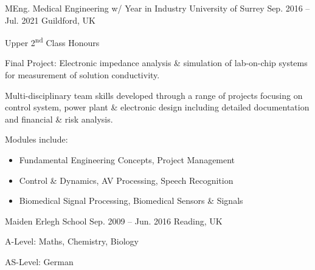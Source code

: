 

\begin{cventries}

  \cventry
    {MEng. Medical Engineering w/ Year in Industry}
    {University of Surrey}
    {Sep. 2016 -- Jul. 2021}
    {Guildford, UK}
    {
      \begin{cvitems}
        \item[] Upper 2\textsuperscript{nd} Class Honours\\
        \item Final Project: Electronic impedance analysis \& simulation of lab-on-chip systems for measurement of solution conductivity.
        \item Multi-disciplinary team skills developed through a range of projects focusing on control system, power plant \& electronic design including detailed documentation and financial \& risk analysis.\\
        \item[] Modules include:
        \begin{itemize}
            \item Fundamental Engineering Concepts, Project Management
            \item Control \& Dynamics, AV Processing, Speech Recognition
            \item Biomedical Signal Processing, Biomedical Sensors \& Signals
        \end{itemize}
      \end{cvitems}
    }

    \cventry
      {}
      {Maiden Erlegh School}
      {Sep. 2009 -- Jun. 2016}
      {Reading, UK}
      {
        \begin{cvitems}
          \item {A-Level: Maths, Chemistry, Biology}
          \item {AS-Level: German}
        \end{cvitems}
      }

\end{cventries}

